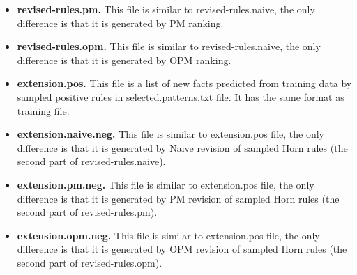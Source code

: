 \documentclass[12pt]{article}
\begin{document}
\begin{itemize}
\item \textbf{revised-rules.pm.} This file is similar to revised-rules.naive, the only difference is that it is generated by PM ranking.

\item \textbf{revised-rules.opm.} This file is similar to revised-rules.naive, the only difference is that it is generated by OPM ranking.

\item \textbf{extension.pos.} This file is a list of new facts predicted from training data by sampled positive rules in selected.patterns.txt file. It has the same format as training file.

\item \textbf{extension.naive.neg.} This file is similar to extension.pos file, the only difference is that it is generated by Naive revision of sampled Horn rules (the second part of revised-rules.naive).

\item \textbf{extension.pm.neg.} This file is similar to extension.pos file, the only difference is that it is generated by PM revision of sampled Horn rules (the second part of revised-rules.pm).

\item \textbf{extension.opm.neg.} This file is similar to extension.pos file, the only difference is that it is generated by OPM revision of sampled Horn rules (the second part of revised-rules.opm).

\end{itemize}
\end{document}
